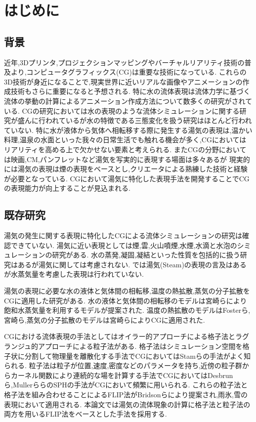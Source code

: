 \chapter{はじめに}
\section{背景}
近年,3Dプリンタ,プロジェクションマッピングやバーチャルリアリティ技術の普及より,コンピュータグラフィックス(CG)は重要な技術になっている.
これらの3D技術が身近になることで,現実世界に近いリアルな画像やアニメーションの作成技術もさらに重要になると予想される.
特に水の流体表現は流体力学に基づく流体の挙動の計算によるアニメーション作成方法について数多くの研究がされている.
CGの研究においては水の表現のような流体シミュレーションに関する研究が盛んに行われているが水の特徴である三態変化を扱う研究はほとんど行われていない.
特に水が液体から気体へ相転移する際に発生する湯気の表現は,温かい料理,温泉の水面といった我々の日常生活でも触れる機会が多く,CGにおいてはリアリティを高める上で欠かせない要素と考えられる.
またCGの分野においては映画,CM,パンフレットなど湯気を写実的に表現する場面は多々あるが
現実的には湯気の表現は煙の表現をベースとし,クリエータによる熟練した技術と経験が必要となっている.
CGにおいて湯気に特化した表現手法を開発することでCGの表現能力が向上することが見込まれる.

\section{既存研究}

湯気の発生に関する表現に特化したCGによる流体シミュレーションの研究は確認できていない.
湯気に近い表現としては煙\cite{Fedkiw2001},雲\cite{Dobashi2000}\cite{Miyazaki2001}\cite{Miyazaki2002},火山噴煙\cite{Mizuno2003}\cite{Mizuno2004},水煙\cite{Nielsen2013},水滴と水泡\cite{Mihalef2009}のシミュレーションの研究がある.
水の蒸発,凝固,凝結といった性質を包括的に扱う研究\cite{Fujisawa2008}はあるが湯気に関しては考慮されない.
\cite{Foster1997}では湯気(Steam)の表現の言及はあるが水蒸気量を考慮した表現は行われていない.

湯気の表現に必要な水の液体と気体間の相転移,温度の熱拡散,蒸気の分子拡散をCGに適用した研究がある.
水の液体と気体間の相転移のモデルは宮崎ら\cite{Miyazaki2001}\cite{Miyazaki2002}により飽和水蒸気量を利用するモデルが提案された.
温度の熱拡散のモデルはFosterら\cite{Foster1997},宮崎ら\cite{Miyazaki2002},蒸気の分子拡散のモデルは宮崎ら\cite{Miyazaki2002}によりCGに適用された.

CGにおける流体表現の手法としてはオイラー的アプローチによる格子法とラグランジュ的アプローチによる粒子法がある.
格子法はシミュレーション空間を格子状に分割して物理量を離散化する手法でCGにおいてはStamら\cite{Stam1999}の手法がよく知られる.
粒子法は粒子が位置,速度,密度などのパラメータを持ち,近傍の粒子群からカーネル関数により連続的な場を計算する手法でCGにおいてはDesbrunら\cite{desbrun},Mullerら\cite{Muller2003}らのSPHの手法がCGにおいて頻繁に用いられる.
これらの粒子法と格子法を組み合わせることによるFLIP法がBridsonら\cite{Zhu2005}により提案され,雨氷\cite{Ishikawa2015},雪\cite{Stomakhin2013}の表現において適用される.
本論文では湯気の流体現象の計算に格子法と粒子法の両方を用いるFLIP法をベースとした手法を採用する.

